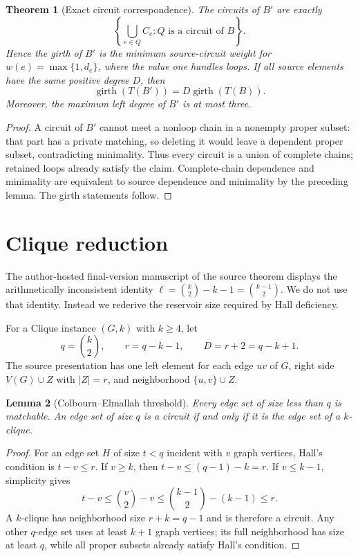 \documentclass[11pt]{article}
\newtheorem{theorem}{Theorem}
\newtheorem{lemma}[theorem]{Lemma}
\begin{document}
\begin{theorem}[Exact circuit correspondence]
The circuits of $B'$ are exactly
\[
 \left\{\bigcup_{e\in Q}C_e:Q\text{ is a circuit of }B\right\}.
\]
Hence the girth of $B'$ is the minimum source-circuit weight for
$w(e)=\max\{1,d_e\}$, where the value one handles loops. If all source
elements have the same positive degree $D$, then
\[
 \operatorname{girth}(T(B'))=D\operatorname{girth}(T(B)).
\]
Moreover, the maximum left degree of $B'$ is at most three.
\end{theorem}
\begin{proof}
A circuit of $B'$ cannot meet a nonloop chain in a nonempty proper subset: that
part has a private matching, so deleting it would leave a dependent proper
subset, contradicting minimality. Thus every circuit is a union of complete
chains; retained loops already satisfy the claim. Complete-chain dependence
and minimality are equivalent to source dependence and minimality by the
preceding lemma. The girth statements follow.
\end{proof}

\section{Clique reduction}
The author-hosted final-version manuscript of the source theorem displays the
arithmetically inconsistent identity
$\ell={k\choose2}-k-1={k-1\choose2}$. We do not use that identity. Instead we
rederive the reservoir size required by Hall deficiency.

For a Clique instance $(G,k)$ with $k\geq4$, let
\[
 q={k\choose2},\qquad r=q-k-1,\qquad D=r+2=q-k+1.
\]
The source presentation has one left element for each edge $uv$ of $G$, right
side $V(G)\cup Z$ with $|Z|=r$, and neighborhood $\{u,v\}\cup Z$.

\begin{lemma}[Colbourn--Elmallah threshold]
Every edge set of size less than $q$ is matchable. An edge set of size $q$ is a
circuit if and only if it is the edge set of a $k$-clique.
\end{lemma}
\begin{proof}
For an edge set $H$ of size $t<q$ incident with $v$ graph vertices, Hall's
condition is $t-v\leq r$. If $v\geq k$, then
$t-v\leq(q-1)-k=r$. If $v\leq k-1$, simplicity gives
\[
 t-v\leq {v\choose2}-v\leq {k-1\choose2}-(k-1)\leq r.
\]
A $k$-clique has neighborhood size $r+k=q-1$ and is therefore a circuit.
Any other $q$-edge set uses at least $k+1$ graph vertices; its full
neighborhood has size at least $q$, while all proper subsets already satisfy
Hall's condition.
\end{proof}
\end{document}
